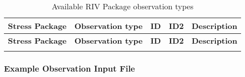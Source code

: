 \begin{longtable}{p{2cm} p{2.75cm} p{2cm} p{1.25cm} p{7cm}}
\caption{Available RIV Package observation types} \tabularnewline

\hline
\hline
\textbf{Stress Package} & \textbf{Observation type} & \textbf{ID} & \textbf{ID2} & \textbf{Description} \\
\hline
\endfirsthead

\hline
\hline
\textbf{Stress Package} & \textbf{Observation type} & \textbf{ID} & \textbf{ID2} & \textbf{Description} \\
\hline
\endhead

\hline
\endfoot


\label{table:gwf-rivobstype}
\end{longtable}

\vspace{5mm}
\subsubsection{Example Observation Input File}

